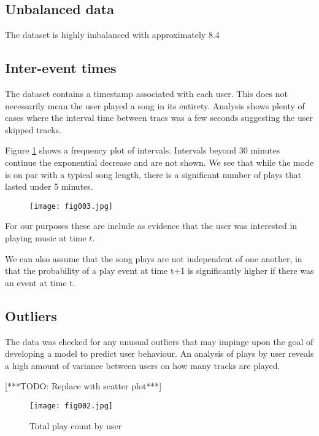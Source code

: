\subsection{Unbalanced data}
The dataset is highly imbalanced with approximately 8.4%

\subsection{Inter-event times}

The dataset contains a timestamp associated with each user. This does not necessarily mean the user played a song in its entirety. Analysis shows plenty of cases where the interval time between tracs was a few seconds suggesting the user skipped tracks. 

Figure \ref{3d} shows a frequency plot of intervals. Intervals beyond 30 minutes continue the exponential decrease and are not shown. We see that while the mode is on par with a typical song length, there is a significant number of plays that lasted under 5 minutes. 

\begin{figure}[h!]
	\centering
	\texttt{[image: fig003.jpg]}
	\caption{}
	\label{3d}
\end{figure} 

For our purposes these are include as evidence that the user was interested in playing music at time $t$.

We can also assume that the song plays are not independent of one another, in that the probability of a play event at time t+1 is significantly higher if there was an event at time t. 


\subsection{Outliers}

The data was checked for any unusual outliers that may impinge upon the goal of developing a model to predict user behaviour. An analysis of plays by user reveals a high amount of variance between users on how many tracks are played. 

[***TODO: Replace with scatter plot***]

\begin{figure}[h!]
	\centering
	\texttt{[image: fig002.jpg]}
	\caption{Total play count by user}
	\label{fig:fig2}
\end{figure} 


